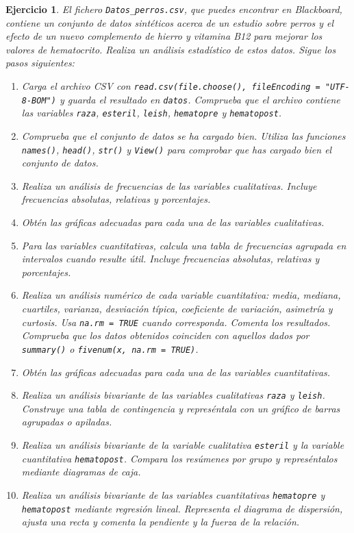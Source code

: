 \documentclass[11pt,a4paper]{article}
\theoremstyle{exercise}
\newtheorem{exercise}{Ejercicio}
\begin{document}
\begin{exercise} El fichero \texttt{Datos\_perros.csv}, que puedes encontrar en Blackboard, contiene un conjunto de datos sintéticos acerca de un estudio sobre perros y el efecto de un nuevo complemento de hierro y vitamina B12 para mejorar los valores de hematocrito. Realiza un análisis estadístico de estos datos. Sigue los pasos siguientes:

\begin{enumerate}
	\item Carga el archivo CSV con \verb|read.csv(file.choose(), fileEncoding = "UTF-8-BOM")| y guarda el resultado en \texttt{datos}. Comprueba que el archivo contiene las variables \texttt{raza}, \texttt{esteril}, \texttt{leish}, \texttt{hematopre} y \texttt{hematopost}.

	\item Comprueba que el conjunto de datos se ha cargado bien. Utiliza las funciones \texttt{names()}, \texttt{head()}, \texttt{str()} y \texttt{View()} para comprobar que has cargado bien el conjunto de datos.

	\item Realiza un análisis de frecuencias de las variables cualitativas. Incluye frecuencias absolutas, relativas y porcentajes.

	\item Obtén las gráficas adecuadas para cada una de las variables cualitativas. 

	\item Para las variables cuantitativas, calcula una tabla de frecuencias agrupada en intervalos cuando resulte útil. Incluye frecuencias absolutas, relativas y porcentajes. 

	\item Realiza un análisis numérico de cada variable cuantitativa: media, mediana, cuartiles, varianza, desviación típica, coeficiente de variación, asimetría y curtosis. Usa \texttt{na.rm = TRUE} cuando corresponda. Comenta los resultados. Comprueba que los datos obtenidos coinciden con aquellos dados por \texttt{summary()} o \texttt{fivenum(x, na.rm = TRUE)}.

	\item Obtén las gráficas adecuadas para cada una de las variables cuantitativas.
	
	\item Realiza un análisis bivariante de las variables cualitativas \texttt{raza} y \texttt{leish}. Construye una tabla de contingencia y represéntala con un gráfico de barras agrupadas o apiladas.

	\item Realiza un análisis bivariante de la variable cualitativa \texttt{esteril} y la variable cuantitativa \texttt{hematopost}. Compara los resúmenes por grupo y represéntalos mediante diagramas de caja.

	\item Realiza un análisis bivariante de las variables cuantitativas \texttt{hematopre} y \texttt{hematopost} mediante regresión lineal. Representa el diagrama de dispersión, ajusta una recta y comenta la pendiente y la fuerza de la relación.
	\end{enumerate}
\end{exercise}
\end{document}
